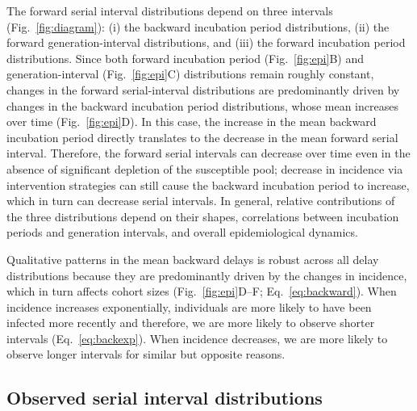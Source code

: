 \documentclass[12pt]{article}
\newcommand{\eref}[1]{Eq.~\ref{eq:#1}}
\newcommand{\fref}[1]{Fig.~\ref{fig:#1}}
\begin{document}
The forward serial interval distributions depend on three intervals (\fref{diagram}): (i) the backward incubation period distributions, (ii) the forward generation-interval distributions, and (iii) the forward incubation period distributions.
Since both forward incubation period (\fref{epi}B) and generation-interval (\fref{epi}C) distributions remain roughly constant, changes in the forward serial-interval distributions are predominantly driven by changes in the backward incubation period distributions, whose mean increases over time (\fref{epi}D). 
In this case, the increase in the mean backward incubation period directly translates to the decrease in the mean forward serial interval.
Therefore, the forward serial intervals can decrease over time even in the absence of significant depletion of the susceptible pool;
decrease in incidence via intervention strategies can still cause the backward incubation period to increase, which in turn can decrease serial intervals. 
In general, relative contributions of the three distributions depend on their shapes, correlations between incubation periods and generation intervals, and overall epidemiological dynamics.

Qualitative patterns in the mean backward delays is robust across all delay distributions because they are predominantly driven by the changes in incidence, which in turn affects cohort sizes (\fref{epi}D--F; \eref{backward}).
When incidence increases exponentially, individuals are more likely to have been infected more recently and therefore, we are more likely to observe shorter intervals (\eref{backexp}).
When incidence decreases, we are more likely to observe longer intervals for similar but opposite reasons.

\subsection{Observed serial interval distributions}
\end{document}
